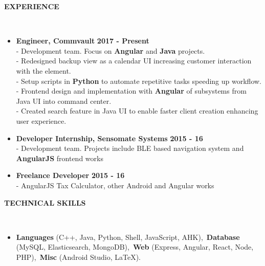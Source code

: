 \documentclass[a4paper,10pt]{article}
\newcommand{\lsep}{-0.5cm}
\newcommand{\resheading}[1]{{\small \colorbox{mygrey}{\begin{minipage}{0.975\textwidth}{\textbf{\uppercase{#1} \vphantom{p\^{E}}}}\end{minipage}}}}
\newcommand{\when}[1]{\hfill \textbf{#1}}
\newenvironment{noSepItemize}
{ \begin{itemize}
    \setlength{\itemsep}{1pt}
    \setlength{\parskip}{0pt}
    \setlength{\parsep}{0pt}     }
{ \end{itemize}                  }
\begin{document}
\resheading{\textbf{Experience} }\\[\lsep]
\begin{noSepItemize}
\item \noindent \textbf{Engineer, Commvault} \when{2017 - Present}\\
	\indent - Development team. Focus on \textbf{Angular} and \textbf{Java} projects.\\
	\indent - Redesigned backup view as a calendar UI increasing customer interaction with the element.\\
	\indent - Setup scripts in \textbf{Python} to automate repetitive tasks speeding up workflow.\\
	\indent - Frontend design and implementation with \textbf{Angular} of subsystems from Java UI into command center.\\
	\indent - Created search feature in Java UI to enable faster client creation enhancing user experience.
\item \noindent \textbf{Developer Internship, Sensomate Systems} \when{2015 - 16}\\
	\indent - Development team. Projects include BLE based navigation system and \textbf{AngularJS} frontend works
\item \noindent \textbf{Freelance Developer} \when{2015 - 16}\\
	\indent - AngularJS Tax Calculator, other Android and Angular works
\end{noSepItemize}

\resheading{\textbf{TECHNICAL SKILLS} }\\[\lsep]
\begin{noSepItemize}
\item \noindent \textbf{Languages} (C++, Java, Python, Shell, JavaScript, AHK),\, \textbf{Database} (MySQL, Elasticsearch, MongoDB),\, \textbf{Web} (Express, Angular, React, Node, PHP),\, \textbf{Misc} (Android Studio, \LaTeX).
\end{noSepItemize}
\end{document}
